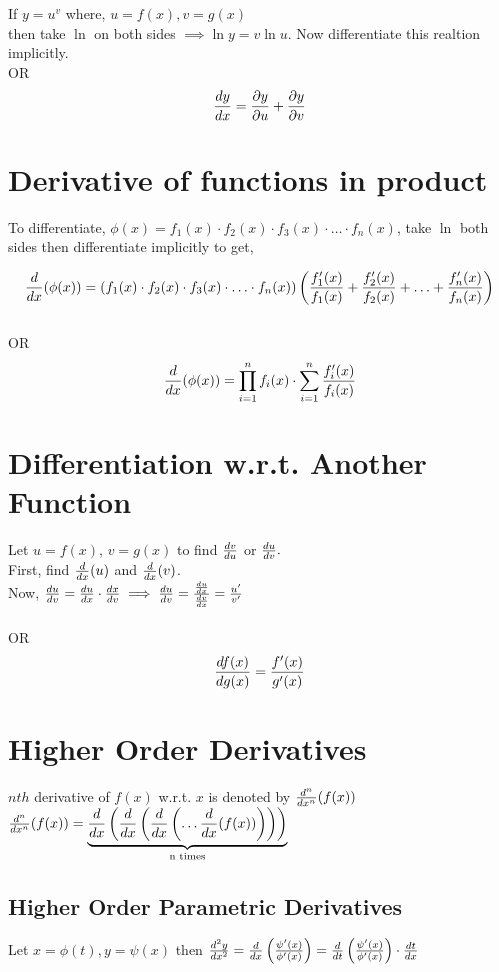 \documentclass{article}
\begin{document}
    If $y= u^v$ where, $u=f(x), v= g(x)$\\ then take $\ln$ on both sides $\implies \ln y = v \ln u.$ Now differentiate this realtion implicitly. \\
    \hphantom{1cm}\hspace{5cm} OR \\
    $$\dv{y}{x}=\pdv{y}{u}+\pdv{y}{v}$$

\section{Derivative of functions in product}
To differentiate, $\phi (x)= f_{1}(x) \cdot f_{2}(x) \cdot f_{3}(x) \cdot \ldots \cdot f_{n}(x)$, 
take $\ln$ both sides then differentiate implicitly to get, 

$$\dv{x}(\phi (x))=\left(f_{1}(x) \cdot f_{2}(x) \cdot f_{3}(x) \cdot \ldots \cdot f_{n}(x)\right)\left(\frac{f_{1}'(x)}{f_{1}(x)}+\frac{f_{2}'(x)}{f_{2}(x)}+ \ldots +\frac{f_{n}'(x)}{f_{n}(x)}\right)$$ \\ \hphantom{1cm} \hspace{5 cm} OR
$$\dv{x}(\phi (x))=\prod_{i=1}^{n} f_{i}(x) \cdot \displaystyle\sum_{i=1}^{n} \frac{f_{i}'(x)}{f_{i}(x)}$$

\section{Differentiation w.r.t. Another Function}
Let $u=f(x)$, $v=g(x)$ to find $\dv{v}{u}$ or $\dv{u}{v}.$ \\
First, find $\dv{x}(u)$ and $\dv{x}(v)$. \\
Now, $\dv{u}{v}=\dv{u}{x}\cdot \dv{x}{v}\implies \dv{u}{v}=\frac{\dv{u}{x}}{\dv{v}{x}}=\frac{u'}{v'}$ \\ \\
\hphantom{1cm} \hspace{5cm} OR \\
$$\dv{f(x)}{g(x)}=\frac{f'(x)}{g'(x)}$$

\section{Higher Order Derivatives}
$nth$ derivative of $f(x)$ w.r.t. $x$ is denoted by $\dv[n]{x}(f(x))$ \\
$\dv[n]{x}(f(x))=\underbrace{\frac{d}{dx}\left(\frac{d}{dx} \left(\frac{d}{dx} \left(\ldots \dv{x}(f(x))\right)\right)\right)}_\text{n times}$
\subsection{Higher Order Parametric Derivatives}
Let $x=\phi (t), y=\psi (x)$ then $\dv[2]{y}{x}=\frac{d}{dx}\left(\frac{\psi'(x)}{\phi'(x)}\right)=\frac{d}{dt}\left(\frac{\psi'(x)}{\phi'(x)}\right)\cdot \dv{t}{x}$
\end{document}
